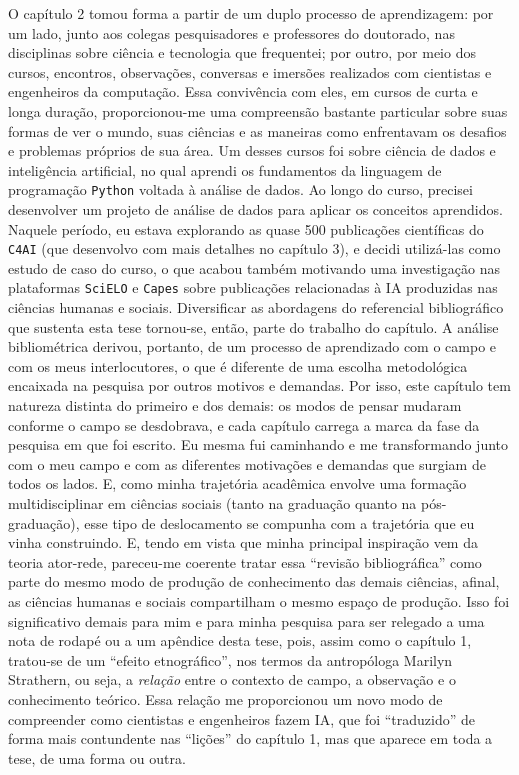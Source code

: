 O capítulo 2 tomou forma a partir de um duplo processo de aprendizagem: por um lado, junto aos colegas pesquisadores e professores do doutorado, nas disciplinas sobre ciência e tecnologia que frequentei; por outro, por meio dos cursos, encontros, observações, conversas e imersões realizados com cientistas e engenheiros da computação. Essa convivência com eles, em cursos de curta e longa duração, proporcionou-me uma compreensão bastante particular sobre suas formas de ver o mundo, suas ciências e as maneiras como enfrentavam os desafios e problemas próprios de sua área. Um desses cursos foi sobre ciência de dados e inteligência artificial, no qual aprendi os fundamentos da linguagem de programação \texttt{Python} voltada à análise de dados. Ao longo do curso, precisei desenvolver um projeto de análise de dados para aplicar os conceitos aprendidos. Naquele período, eu estava explorando as quase 500 publicações científicas do \texttt{C4AI} (que desenvolvo com mais detalhes no capítulo 3), e decidi utilizá-las como estudo de caso do curso, o que acabou também motivando uma investigação nas plataformas \texttt{SciELO} e \texttt{Capes} sobre publicações relacionadas à IA produzidas nas ciências humanas e sociais. Diversificar as abordagens do referencial bibliográfico que sustenta esta tese tornou-se, então, parte do trabalho do capítulo. A análise bibliométrica derivou, portanto, de um processo de aprendizado com o campo e com os meus interlocutores, o que é diferente de uma escolha metodológica encaixada na pesquisa por outros motivos e demandas. Por isso, este capítulo tem natureza distinta do primeiro e dos demais: os modos de pensar mudaram conforme o campo se desdobrava, e cada capítulo carrega a marca da fase da pesquisa em que foi escrito. Eu mesma fui caminhando e me transformando junto com o meu campo e com as diferentes motivações e demandas que surgiam de todos os lados. E, como minha trajetória acadêmica envolve uma formação multidisciplinar em ciências sociais (tanto na graduação quanto na pós-graduação), esse tipo de deslocamento se compunha com a trajetória que eu vinha construindo. E, tendo em vista que minha principal inspiração vem da teoria ator-rede, pareceu-me coerente tratar essa \enquote{revisão bibliográfica} como parte do mesmo modo de produção de conhecimento das demais ciências, afinal, as ciências humanas e sociais compartilham o mesmo espaço de produção. Isso foi significativo demais para mim e para minha pesquisa para ser relegado a uma nota de rodapé ou a um apêndice desta tese, pois, assim como o capítulo 1, tratou-se de um \enquote{efeito etnográfico}, nos termos da antropóloga Marilyn Strathern, ou seja, a \textit{relação} entre o contexto de campo, a observação e o conhecimento teórico. Essa relação me proporcionou um novo modo de compreender como cientistas e engenheiros fazem IA, que foi \enquote{traduzido} de forma mais contundente nas \enquote{lições} do capítulo 1, mas que aparece em toda a tese, de uma forma ou outra.

